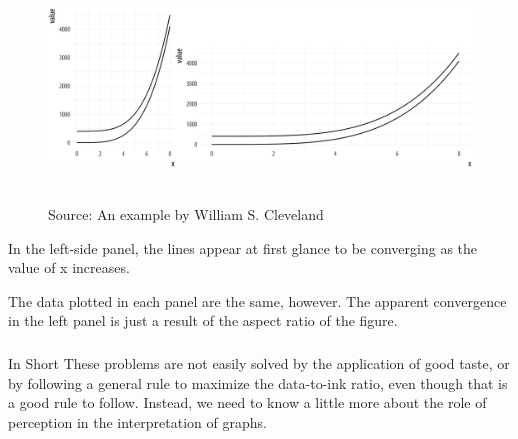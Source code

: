 \documentclass[11pt]{beamer}
\begin{document}
\begin{frame}
	
	\frametitle{\bfseries}
	\begin{figure}
		\vspace{-.5em}
		\includegraphics[width=0.9\linewidth]{Figure/perception-curves-1}
		
		\\
		\tiny{Source: An example by William S. Cleveland}
		\label{fig:anscombe-1}
	\end{figure}
	\begin{itemize}
		\footnotesize{
			\item In the left-side panel, the lines appear at first glance to be converging as the value of x increases.
			\item The data plotted in each panel are the same, however. The apparent convergence in the left panel is just a result of the aspect ratio of the figure. 
		}
	\end{itemize}

\end{frame}

\begin{frame}
	
	\frametitle{\bfseries}
	\begin{block}{In Short}
	These problems are not easily solved by the application of good taste, or by following a general rule to maximize the data-to-ink ratio, even though that is a good rule to follow. Instead, we need to know a little more about the role of perception in the interpretation of graphs. 
	\end{block}

\end{frame}
\end{document}
